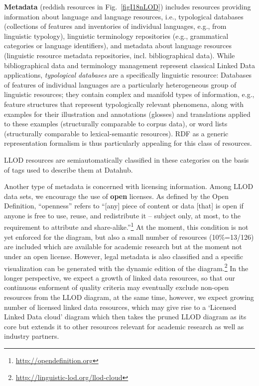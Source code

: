 \textbf{Metadata} (reddish resources in Fig.\ \ref{figI18nLOD}) includes resources providing information about language and language resources, 
i.e., typological databases (collections of features and inventories of individual languages, e.g., from linguistic typology), linguistic terminology repositories (e.g., grammatical categories or language identifiers), and metadata about language resources (linguistic resource metadata repositories, incl. bibliographical data).
While bibliographical data and terminology management represent classical Linked Data applications, \emph{typological databases} are a specifically linguistic resource:
Databases of features of individual languages are a particularly heterogeneous group of linguistic resources; they contain complex and manifold types of information, e.g., feature structures that represent typologically relevant phenomena, along with examples for their illustration and annotations (glosses) and translations applied to these examples (structurally comparable to corpus data), or word lists (structurally comparable to lexical-semantic resources). RDF as a generic representation formalism is thus particularly appealing for this class of resources.

LLOD resources are semiautomatically classified in these categories on the basis of tags used to describe them at Datahub.

Another type of metadata is concerned with licensing information. 
Among LLOD data sets, we encourage the use of \textbf{open} licenses. 
As defined by the Open Definition, ``openness'' refers to ``[any] piece of content or data [that] is open if anyone is free to use, reuse, and redistribute it -- subject only, at most, to the requirement to attribute and share-alike.''\footnote{\url{http://opendefinition.org}}
At the moment, this condition is not yet enforced for the diagram, but also a small number of resources (10\%=13/126) are included which are available for academic research but at the moment not under an open license.
However, legal metadata is also classified and a specific visualization can be generated with the dynamic edition of the diagram.\footnote{
	\url{http://linguistic-lod.org/llod-cloud}
}
In the longer perspective, we expect a growth of linked data resources, so that our continuous enforment of quality criteria may eventually exclude non-open resources from the LLOD diagram, at the same time, however, we expect growing number of licensed linked data resources, which may give rise to a `Licensed Linked Data cloud' diagram which then takes the pruned LLOD diagram as its core but extends it to other resources relevant for academic research as well as industry partners.

